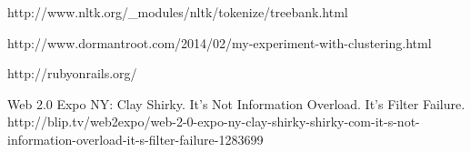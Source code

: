 \documentclass[a4paper,12pt]{article}
\begin{document}
\begin{thebibliography}{9}
    http://www.nltk.org/\_modules/nltk/tokenize/treebank.html

    http://www.dormantroot.com/2014/02/my-experiment-with-clustering.html

    http://rubyonrails.org/
    
    Web 2.0 Expo NY: Clay Shirky. It's Not Information Overload. It's Filter Failure.
    http://blip.tv/web2expo/web-2-0-expo-ny-clay-shirky-shirky-com-it-s-not-information-overload-it-s-filter-failure-1283699

\end{thebibliography}
\end{document}
